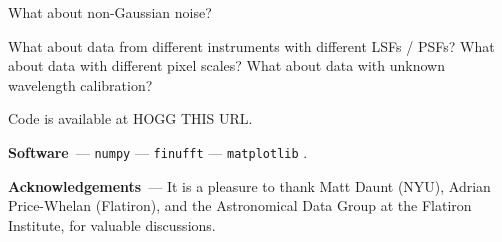 \documentclass[11pt]{article}
\renewcommand{\paragraph}[1]{\medskip\par\noindent\textbf{#1}~---}
\begin{document}
What about non-Gaussian noise?

What about data from different instruments with different LSFs / PSFs? What about data with different pixel scales? What about data with unknown wavelength calibration?

Code is available at HOGG THIS URL.

\paragraph{Software}
\texttt{numpy} \cite{numpy} ---
\texttt{finufft} \cite{finufft} ---
\texttt{matplotlib} \cite{matplotlib}.

\paragraph{Acknowledgements}
It is a pleasure to thank
Matt Daunt (NYU),
Adrian Price-Whelan (Flatiron),
and the Astronomical Data Group at the Flatiron Institute,
for valuable discussions.
\end{document}
